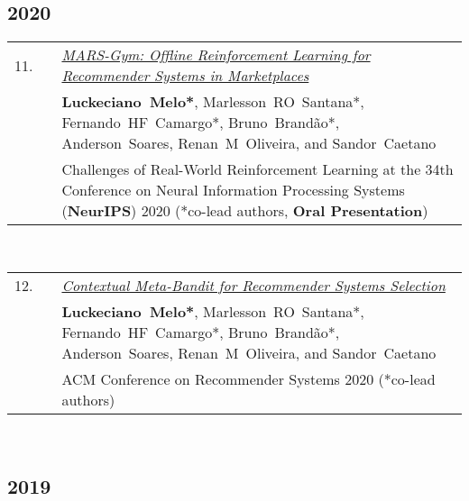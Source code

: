 \documentclass[11pt,letter,sans,colorlinks,linkcolor=true]{moderncv}
\begin{document}
\subsection{2020}

\begin{minipage}{\textwidth}
\begin{tabular}{R{8mm}p{1mm}L{6.5in}}
 11.\hspace*{1mm} && \textit{\href{https://offline-rl-neurips.github.io/pdf/21.pdf}{MARS-Gym: Offline Reinforcement Learning for Recommender Systems in Marketplaces} }  \\
 && \mbox{\textbf{Luckeciano Melo*}}, \mbox{Marlesson RO Santana*}, \mbox{Fernando HF Camargo*}, \mbox{Bruno Brand{\~a}o*}, \mbox{Anderson Soares}, \mbox{Renan M Oliveira}, and \mbox{Sandor Caetano} \\
 && Challenges of Real-World Reinforcement Learning at the 34th Conference on Neural Information Processing Systems (\textbf{NeurIPS}) 2020 (*co-lead authors, \textbf{Oral Presentation}) \\
\end{tabular} \\[2mm]
\end{minipage}

\begin{minipage}{\textwidth}
\begin{tabular}{R{8mm}p{1mm}L{6.5in}}
 12.\hspace*{1mm} && \textit{\href{https://dl.acm.org/doi/10.1145/3383313.3412209}{Contextual Meta-Bandit for Recommender Systems Selection} }  \\
 && \mbox{\textbf{Luckeciano Melo*}}, \mbox{Marlesson RO Santana*}, \mbox{Fernando HF Camargo*}, \mbox{Bruno Brand{\~a}o*}, \mbox{Anderson Soares}, \mbox{Renan M Oliveira}, and \mbox{Sandor Caetano} \\
 && ACM Conference on Recommender Systems 2020 (*co-lead authors) \\
\end{tabular} \\[2mm]
\end{minipage}
\subsection{2019}
\end{document}
